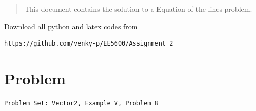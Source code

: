 \documentclass[journal,12pt,twocolumn]{IEEEtran}
\begin{document}
\maketitle

\renewcommand{\thefigure}{\theenumi}
\renewcommand{\thetable}{\theenumi}

\begin{abstract}
This document contains the solution to a Equation of the lines problem.
\end{abstract}
%
Download all python and latex codes from 
% 
\begin{lstlisting}
https://github.com/venky-p/EE5600/Assignment_2
\end{lstlisting}
%
\section{Problem}
\begin{lstlisting}
Problem Set: Vector2, Example V, Problem 8
\end{lstlisting}
\renewcommand{\theequation}{\theenumi}
\end{document}
